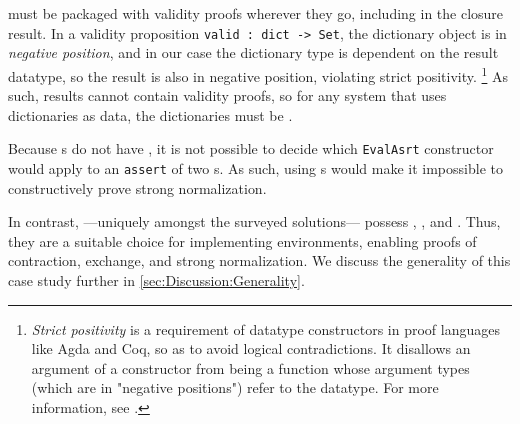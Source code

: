 \Cals{} must be packaged with validity proofs wherever they go, including in the closure result.
In a validity proposition \texttt{valid : dict -> Set},
%
%
the dictionary object is in \emph{negative position},
and in our case the dictionary type is dependent on the result datatype,
so the result is also in negative position, violating strict positivity.%
\footnote{
\emph{Strict positivity} is a requirement of datatype constructors in proof languages like Agda and Coq, so as to avoid logical contradictions.
%
It disallows an argument of a constructor from being a function whose argument types (which are in "negative positions") refer to the datatype.
%
For more information, see \citep{positivity}.
}
As such, results cannot contain validity proofs, so for any system that uses dictionaries as data,
the dictionaries must be \semanticallyTotal.

Because \fpf{}s do not have \EqDec, it is not possible to decide which \texttt{EvalAsrt} constructor would
apply to an \texttt{assert} of two \fpf{}s. As such, using \fpf{}s would make it impossible to constructively prove strong normalization.

In contrast, \dds{} ---uniquely amongst the surveyed solutions--- possess \SemTot, \SemInj, and \EqDec.
%
Thus, they are a suitable choice for implementing environments, enabling proofs of contraction, exchange, and strong normalization.
%
We discuss the generality of this case study further in \autoref{sec:Discussion:Generality}.
